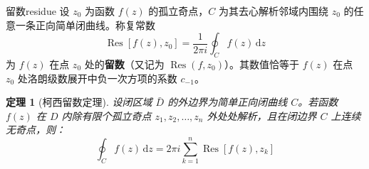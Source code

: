 \documentclass[11pt,a4paper,fontset=fandol]{ctexart}
\newtheorem{theorem}{定理}[section]
\theoremstyle{remark}
\begin{document}
\begin{definition}{留数}{residue}
设 $z_0$ 为函数 $f(z)$ 的孤立奇点，$C$ 为其去心解析邻域内围绕 $z_0$ 的任意一条正向简单闭曲线。称复常数
\begin{equation}
    \operatorname{Res}[f(z), z_0] = \frac{1}{2\pi i} \oint_C f(z)\,\mathrm{d}z
\end{equation}
为 $f(z)$ 在点 $z_0$ 处的\textbf{留数}（又记为 $\operatorname{Res}(f, z_0)$）。其数值恰等于 $f(z)$ 在点 $z_0$ 处洛朗级数展开中负一次方项的系数 $c_{-1}$。
\end{definition}

\begin{theorem}[柯西留数定理]
设闭区域 $\bar{D}$ 的外边界为简单正向闭曲线 $C$。若函数 $f(z)$ 在 $D$ 内除有限个孤立奇点 $z_1, z_2, \dots, z_n$ 外处处解析，且在闭边界 $C$ 上连续无奇点，则：
\begin{equation}
    \oint_C f(z)\,\mathrm{d}z = 2\pi i \sum_{k=1}^n \operatorname{Res}[f(z), z_k]
\end{equation}
\end{theorem}
\end{document}
